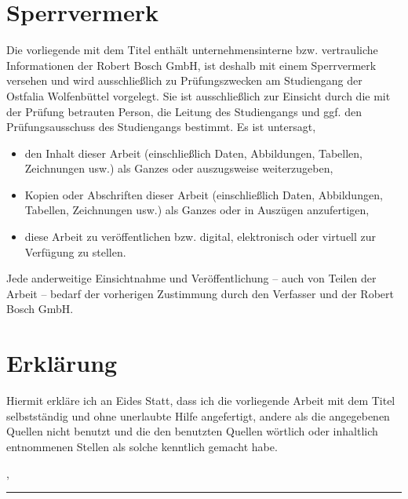 \section*{Sperrvermerk}\thispagestyle{empty}
Die vorliegende \myTextArt mit dem Titel \textit{\myTitle} enthält unternehmensinterne bzw. vertrauliche Informationen der Robert Bosch GmbH, ist deshalb mit einem Sperrvermerk versehen und wird ausschließlich zu Prüfungszwecken am Studiengang \myStudiengang der Ostfalia Wolfenbüttel vorgelegt. Sie ist ausschließlich zur Einsicht durch die mit der Prüfung betrauten Person, die Leitung des Studiengangs und ggf. den Prüfungsausschuss des Studiengangs bestimmt. Es ist untersagt,
\begin{itemize}
	\item den Inhalt dieser Arbeit (einschließlich Daten, Abbildungen, Tabellen, Zeichnungen usw.) als Ganzes oder auszugsweise weiterzugeben,
	\item Kopien oder Abschriften dieser Arbeit (einschließlich Daten, Abbildungen, Tabellen, Zeichnungen usw.) als Ganzes oder in Auszügen anzufertigen,
	\item diese Arbeit zu veröffentlichen bzw. digital, elektronisch oder virtuell zur Verfügung zu stellen. 
\end{itemize}
Jede anderweitige Einsichtnahme und Veröffentlichung – auch von Teilen der Arbeit – bedarf der vorherigen Zustimmung durch den Verfasser und der Robert Bosch GmbH.

\clearpage

\section*{Erklärung}\thispagestyle{empty}
Hiermit erkläre ich an Eides Statt, dass ich die vorliegende Arbeit mit dem Titel \textit{\myTitle} selbstständig und  ohne  unerlaubte  Hilfe  angefertigt,  andere  als  die  angegebenen  Quellen  nicht benutzt und die den benutzten Quellen wörtlich oder inhaltlich entnommenen Stellen als solche kenntlich gemacht habe.

\vspace{3em}

\myOrt, \myDate
\vspace{4em}

\rule{6cm}{0.4pt}\\
\myAuthorA


\clearpage

